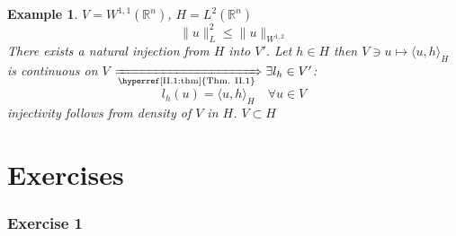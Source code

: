 \documentclass[12pt]{extreport} %
\newcommand{\R}{\mathbb{R}}
\theoremstyle{named}
\theoremstyle{nnamed}
\theoremstyle{itshape}
\theoremstyle{normal}
\newtheorem*{example}{Example}
\begin{document}
\begin{example}
	$V = W^{1,1}(\R^n)$, $H = L^2(\R^n)$
 		$$ \| u \|_L^2 \leq \| u \|_{W^{1,2}} $$	
 	There exists a natural injection from $H$ into $V'$. Let $h \in H$ then $V \ni u \mapsto \langle u, h \rangle_H$ is continuous on $V$ $\xRightarrow[\text{\hyperref[II.1:thm]{Thm. II.1}}]{} \exists l_h \in V'$:
 		$$ l_h(u) = \langle u, h \rangle_H \quad \forall u \in V $$
 	injectivity follows from density of $V$ in $H$. $V \subset H $
\end{example}


\appendix %

\chapter{Exercises}

\subsection*{Exercise 1}
\end{document}
